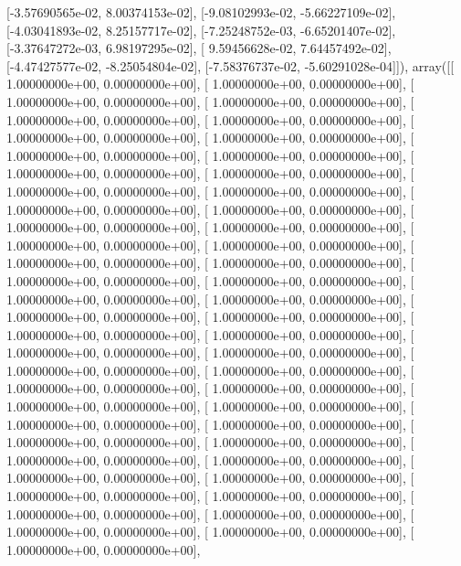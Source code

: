 \documentclass{article}
\begin{document}
       [-3.57690565e-02,  8.00374153e-02],
       [-9.08102993e-02, -5.66227109e-02],
       [-4.03041893e-02,  8.25157717e-02],
       [-7.25248752e-03, -6.65201407e-02],
       [-3.37647272e-03,  6.98197295e-02],
       [ 9.59456628e-02,  7.64457492e-02],
       [-4.47427577e-02, -8.25054804e-02],
       [-7.58376737e-02, -5.60291028e-04]]), array([[ 1.00000000e+00,  0.00000000e+00],
       [ 1.00000000e+00,  0.00000000e+00],
       [ 1.00000000e+00,  0.00000000e+00],
       [ 1.00000000e+00,  0.00000000e+00],
       [ 1.00000000e+00,  0.00000000e+00],
       [ 1.00000000e+00,  0.00000000e+00],
       [ 1.00000000e+00,  0.00000000e+00],
       [ 1.00000000e+00,  0.00000000e+00],
       [ 1.00000000e+00,  0.00000000e+00],
       [ 1.00000000e+00,  0.00000000e+00],
       [ 1.00000000e+00,  0.00000000e+00],
       [ 1.00000000e+00,  0.00000000e+00],
       [ 1.00000000e+00,  0.00000000e+00],
       [ 1.00000000e+00,  0.00000000e+00],
       [ 1.00000000e+00,  0.00000000e+00],
       [ 1.00000000e+00,  0.00000000e+00],
       [ 1.00000000e+00,  0.00000000e+00],
       [ 1.00000000e+00,  0.00000000e+00],
       [ 1.00000000e+00,  0.00000000e+00],
       [ 1.00000000e+00,  0.00000000e+00],
       [ 1.00000000e+00,  0.00000000e+00],
       [ 1.00000000e+00,  0.00000000e+00],
       [ 1.00000000e+00,  0.00000000e+00],
       [ 1.00000000e+00,  0.00000000e+00],
       [ 1.00000000e+00,  0.00000000e+00],
       [ 1.00000000e+00,  0.00000000e+00],
       [ 1.00000000e+00,  0.00000000e+00],
       [ 1.00000000e+00,  0.00000000e+00],
       [ 1.00000000e+00,  0.00000000e+00],
       [ 1.00000000e+00,  0.00000000e+00],
       [ 1.00000000e+00,  0.00000000e+00],
       [ 1.00000000e+00,  0.00000000e+00],
       [ 1.00000000e+00,  0.00000000e+00],
       [ 1.00000000e+00,  0.00000000e+00],
       [ 1.00000000e+00,  0.00000000e+00],
       [ 1.00000000e+00,  0.00000000e+00],
       [ 1.00000000e+00,  0.00000000e+00],
       [ 1.00000000e+00,  0.00000000e+00],
       [ 1.00000000e+00,  0.00000000e+00],
       [ 1.00000000e+00,  0.00000000e+00],
       [ 1.00000000e+00,  0.00000000e+00],
       [ 1.00000000e+00,  0.00000000e+00],
       [ 1.00000000e+00,  0.00000000e+00],
       [ 1.00000000e+00,  0.00000000e+00],
       [ 1.00000000e+00,  0.00000000e+00],
       [ 1.00000000e+00,  0.00000000e+00],
       [ 1.00000000e+00,  0.00000000e+00],
       [ 1.00000000e+00,  0.00000000e+00],
       [ 1.00000000e+00,  0.00000000e+00],
       [ 1.00000000e+00,  0.00000000e+00],
       [ 1.00000000e+00,  0.00000000e+00],
       [ 1.00000000e+00,  0.00000000e+00],
       [ 1.00000000e+00,  0.00000000e+00],
\end{document}
